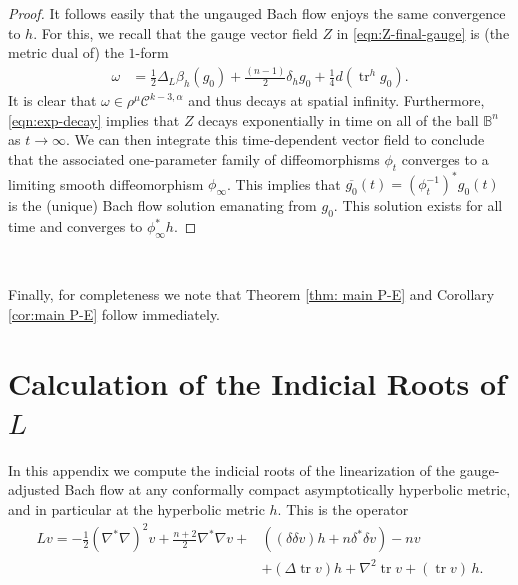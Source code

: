 \documentclass[10pt,reqno]{amsart}
\DeclareMathOperator{\tr}{tr}
\begin{document}
\begin{proof}

It follows easily that the ungauged Bach flow enjoys the same convergence to $h$.   For this, we recall that the gauge vector field $Z$ in \eqref{eqn:Z-final-gauge} is 
(the metric dual of) the $1$-form
\begin{align*}  
\omega &= \frac{1}{2} \Delta_L \beta_{h} (g_0)  +\frac{(n-1)}{2} \delta_{h} g_0 + \frac{1}{4} d( \tr^{h} g_0 ).
\end{align*}
It is clear that $\omega \in \rho^{\mu} \mathcal C^{k-3,\alpha}$ and thus decays at spatial infinity.  Furthermore, \eqref{eqn:exp-decay} implies that $Z$ decays exponentially in 
time on all of the ball $\mathbb{B}^n$ as $t \to \infty$.  We can then integrate this time-dependent vector field to conclude that the associated one-parameter family of diffeomorphisms 
$\phi_t$ converges to a limiting smooth diffeomorphism $\phi_{\infty}$.  This implies that $\overline{g_0}(t) = (\phi^{-1}_t)^* g_0(t)$ is the (unique) Bach flow solution 
emanating from $g_0$. This solution exists for all time and converges to $\phi^*_{\infty} h$. 
\end{proof}

\ 

Finally, for completeness we note that Theorem \ref{thm: main P-E} and Corollary \ref{cor:main P-E} follow immediately. 

\appendix

\newcommand{\Mbar}{\overline{M}}
\newcommand{\qbar}{\overline{q}}
\newcommand{\barq}{\overline{q}}
\newcommand{\ubar}{\overline{u}}
\newcommand{\Gambar}{\overline{\Gamma}}
\newcommand{\rhob}{\overline{\rho}}
\newcommand{\gendudu}[5]{{#1}^{\phantom{#2}#3\phantom{,#4}#5}_{#2\phantom{#3},#4}}
\newcommand{\genddud}[5]{{#1}_{#2 #3, \phantom{#4} #5}^{\phantom{#2#3,}#4}}

\section{Calculation of the Indicial Roots of $L$}
\label{sec:appendix}
In this appendix we compute the indicial roots of the linearization of the gauge-adjusted Bach flow at any conformally compact
asymptotically hyperbolic metric, and in particular at the hyperbolic metric $h$. This is the operator
\begin{align}
Lv = -\frac12 (\nabla^*\nabla)^2 v + \frac{n+2}{2} \nabla^* \nabla v + & \left((\delta \delta v) h  + n \delta^* \delta v\right) - nv \nonumber \\
& + ( \Delta \tr v) h + \nabla^2 \tr v + (\tr v)\, h.
\label{galin}
\end{align}
\end{document}
